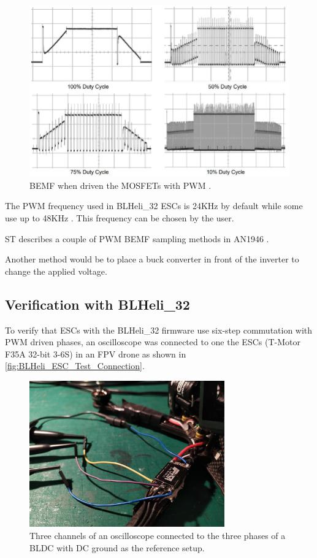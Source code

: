 \documentclass[]{report}
\begin{document}
\begin{figure}[H]
	\centering
	\includegraphics[width=\textwidth]{Microchip_PWM_BackEMF.JPG}
	\caption{BEMF when driven the MOSFETs with PWM \cite{Microchip_AN857}.}
	\label{fig:Microchip_PWM_BackEMF}
\end{figure}

The PWM frequency used in BLHeli\_32 ESCs is 24KHz by default while some use up to 48KHz \cite{BLHeli_32_PWM_Frequency}. This frequency can be chosen by the user. 

ST describes a couple of PWM BEMF sampling methods in AN1946 \cite{ST_PWM_BEMF_sampling}.

Another method would be to place a buck converter in front of the inverter to change the applied voltage.

\subsection{Verification with BLHeli\_32}
To verify that ESCs with the BLHeli\_32 firmware use six-step commutation with PWM driven phases, an oscilloscope was connected to one the ESCs (T-Motor F35A 32-bit 3-6S) in an FPV drone as shown in \autoref{fig:BLHeli_ESC_Test_Connection}.

\begin{figure}[H]
	\centering
	\includegraphics[width=0.75\textwidth]{Scope/EmaxEco2306_threePhases/ScopeOnBLHeli32ESC_7Inch.jpg}
	\caption{Three channels of an oscilloscope connected to the three phases of a BLDC with DC ground as the reference setup.}
	\label{fig:BLHeli_ESC_Test_Connection}
\end{figure}
\end{document}
